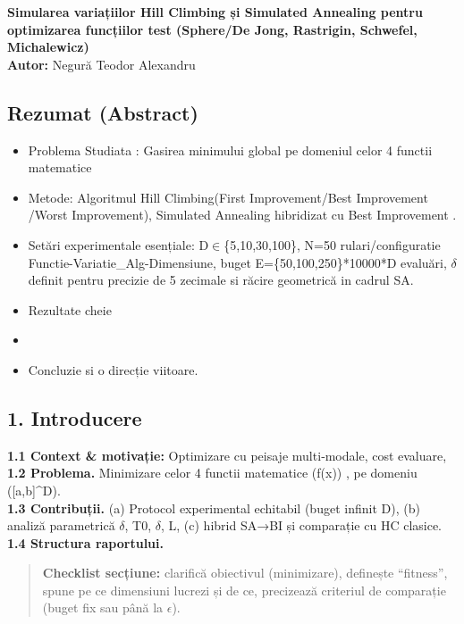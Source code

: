 \documentclass[
]{article}
\author{}
\date{}
\providecommand{\tightlist}{%
  \setlength{\itemsep}{0pt}\setlength{\parskip}{0pt}}
\begin{document}
\textbf{Simularea variațiilor Hill Climbing și Simulated Annealing
pentru optimizarea funcțiilor test (Sphere/De Jong, Rastrigin, Schwefel,
Michalewicz)}\\
\textbf{Autor:} Negură Teodor Alexandru

\hypertarget{rezumat-abstract}{%
\subsection{Rezumat (Abstract)}\label{rezumat-abstract}}

\begin{itemize}
\tightlist
\item
  Problema Studiata : Gasirea minimului global pe domeniul celor 4
  functii matematice
\item
  Metode: Algoritmul Hill Climbing(First Improvement/Best Improvement
  /Worst Improvement), Simulated Annealing hibridizat cu Best
  Improvement .
\item
  Setări experimentale esențiale: D$\in$\{5,10,30,100\}, N=50
  rulari/configuratie Functie-Variatie\_Alg-Dimensiune, buget
  E=\{50,100,250\}*10000*D evaluări, $\delta$ definit pentru precizie de 5
  zecimale si răcire geometrică in cadrul SA.
\item
  Rezultate cheie
\item
\item
  Concluzie si o direcție viitoare.
\end{itemize}

\hypertarget{introducere}{%
\subsection{1. Introducere}\label{introducere}}

\textbf{1.1 Context \& motivație:} Optimizare cu peisaje multi‑modale,
cost evaluare,\\
\textbf{1.2 Problema.} Minimizare celor 4 functii matematice (f(x)) , pe
domeniu ({[}a,b{]}\^{}D).\\
\textbf{1.3 Contribuții.} (a) Protocol experimental echitabil (buget infinit
D), (b) analiză parametrică $\delta$, T0, $\delta$, L, (c) hibrid SA→BI și comparație
cu HC clasice.\\
\textbf{1.4 Structura raportului.}

\begin{quote}
\textbf{Checklist secțiune:} clarifică obiectivul (minimizare),
definește ``fitness'', spune pe ce dimensiuni lucrezi și de ce,
precizează criteriul de comparație (buget fix sau până la $\epsilon$).
\end{quote}
\end{document}

